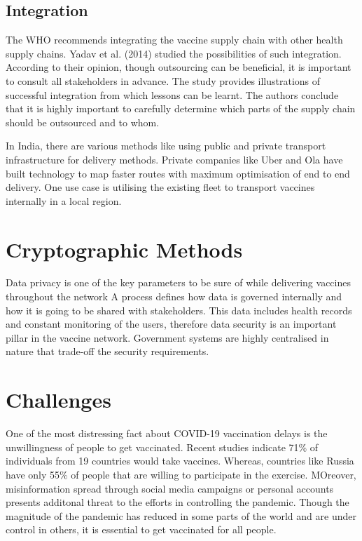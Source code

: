 \documentclass{article}
\begin{document}
 \subsection{Integration}
 The WHO recommends integrating the vaccine supply chain with other health supply chains. Yadav et al. (2014) studied the possibilities of such integration. According to their opinion, though outsourcing can be beneficial, it is important to consult all stakeholders in advance. The study provides illustrations of successful integration from which lessons can be learnt. The authors conclude that it is highly important to carefully determine which parts of the supply chain should be outsourced and to whom.\cite{duijzer2018literature}
 
 In India, there are various methods like using public and private transport infrastructure for delivery methods. Private companies like Uber and Ola have built technology to map faster routes with maximum optimisation of end to end delivery. One use case is utilising the existing fleet to transport vaccines internally in a local region.
\section{Cryptographic Methods}

Data privacy is one of the key parameters to be sure of while delivering vaccines throughout the network A process defines how data is governed internally and how it is going to be shared with stakeholders. This data includes health records and constant monitoring of the users, therefore data security is an important pillar in the vaccine network. Government systems are highly centralised in nature that trade-off the security requirements. 
	
\section{Challenges}

One of the most distressing fact about COVID-19 vaccination delays is the unwillingness of people to get vaccinated. Recent studies indicate 71\% of individuals from 19 countries would take vaccines. Whereas, countries like Russia have only 55\% of people that are willing to participate in the exercise. MOreover, misinformation spread through social media campaigns or personal accounts presents additonal threat to the efforts in controlling the pandemic. Though the magnitude of the pandemic has reduced in some parts of the world and are under control in others, it is essential to get vaccinated for all people. 
\end{document}
